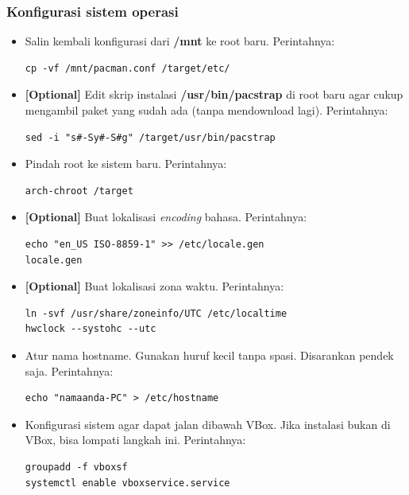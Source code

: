 \documentclass[12pt,]{article}
\begin{document}
	\subsubsection{Konfigurasi sistem operasi}
	\begin{itemize}
		\item Salin kembali konfigurasi dari \textbf{/mnt} ke root baru.
		Perintahnya:
		\begin{verbatim}
cp -vf /mnt/pacman.conf /target/etc/	
		\end{verbatim}	
		
		\item \textbf{[Optional]} Edit skrip instalasi \textbf{/usr/bin/pacstrap} di root baru agar cukup mengambil paket yang sudah ada (tanpa mendownload lagi).
		Perintahnya:
		\begin{verbatim}
sed -i "s#-Sy#-S#g" /target/usr/bin/pacstrap	
		\end{verbatim}
		
		\item Pindah root ke sistem baru.
		Perintahnya:
		\begin{verbatim}
arch-chroot /target
		\end{verbatim}
		
		\item \textbf{[Optional]} Buat lokalisasi \textit{encoding} bahasa.
		Perintahnya:
		\begin{verbatim}
echo "en_US ISO-8859-1" >> /etc/locale.gen
locale.gen
		\end{verbatim}
		
		\item \textbf{[Optional]} Buat lokalisasi zona waktu.
		Perintahnya:
		\begin{verbatim}
ln -svf /usr/share/zoneinfo/UTC /etc/localtime
hwclock --systohc --utc
		\end{verbatim}
		
		\item Atur nama hostname. Gunakan huruf kecil tanpa spasi.
		Disarankan pendek saja.
		Perintahnya:
		\begin{verbatim}
echo "namaanda-PC" > /etc/hostname
		\end{verbatim}
		
		\item Konfigurasi sistem agar dapat jalan dibawah VBox.
		Jika instalasi bukan di VBox, bisa lompati langkah ini.
		Perintahnya:
		\begin{verbatim}
groupadd -f vboxsf
systemctl enable vboxservice.service
		\end{verbatim}
		

\end{itemize}
\end{document}
